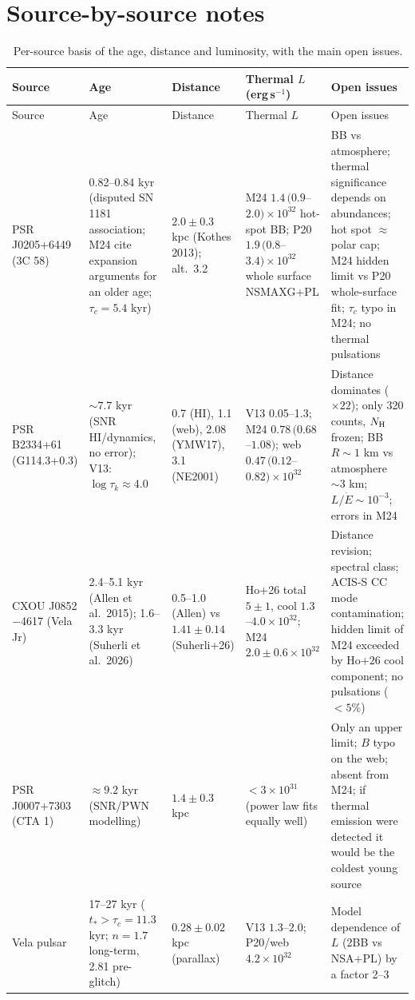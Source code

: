 \documentclass[11pt,a4paper]{article}
\begin{document}
\section{Source-by-source notes}
\begin{longtable}{P{2.3cm}P{2.9cm}P{2.9cm}P{3.0cm}P{3.2cm}}
\caption{Per-source basis of the age, distance and luminosity, with the main open issues.}\label{tab:sources}\\
\toprule
Source & Age & Distance & Thermal $L$ (erg\,s$^{-1}$) & Open issues \\
\midrule
\endfirsthead
\toprule Source & Age & Distance & Thermal $L$ & Open issues \\ \midrule
\endhead
PSR J0205+6449 (3C 58) & 0.82--0.84 kyr (disputed SN 1181 association; M24 cite expansion arguments for an older age; $\tau_c=5.4$ kyr) & $2.0\pm0.3$ kpc (Kothes 2013); alt.\ 3.2 & M24 $1.4\,(0.9$--$2.0)\times10^{32}$ hot-spot BB; P20 $1.9\,(0.8$--$3.4)\times10^{32}$ whole surface NSMAXG+PL & BB vs atmosphere; thermal significance depends on abundances; hot spot $\approx$ polar cap; M24 hidden limit vs P20 whole-surface fit; $\tau_c$ typo in M24; no thermal pulsations \\
PSR B2334+61 (G114.3+0.3) & $\sim7.7$ kyr (SNR HI/dynamics, no error); V13: $\log\tau_k\approx4.0$ & 0.7 (HI), 1.1 (web), 2.08 (YMW17), 3.1 (NE2001) & V13 0.05--1.3; M24 $0.78\,(0.68$--$1.08)$; web $0.47\,(0.12$--$0.82)\times10^{32}$ & Distance dominates ($\times22$); only 320 counts, $N_{\rm H}$ frozen; BB $R\sim1$ km vs atmosphere $\sim3$ km; $L/\dot E\sim10^{-3}$; errors in M24 \\
CXOU J0852$-$4617 (Vela Jr) & 2.4--5.1 kyr (Allen et al.\ 2015); 1.6--3.3 kyr (Suherli et al.\ 2026) & 0.5--1.0 (Allen) vs $1.41\pm0.14$ (Suherli+26) & Ho+26 total $5\pm1$, cool $1.3$--$4.0\times10^{32}$; M24 $2.0\pm0.6\times10^{32}$ & Distance revision; spectral class; ACIS-S CC mode contamination; hidden limit of M24 exceeded by Ho+26 cool component; no pulsations ($<5\%$) \\
PSR J0007+7303 (CTA 1) & $\approx9.2$ kyr (SNR/PWN modelling) & $1.4\pm0.3$ kpc & $<3\times10^{31}$ (power law fits equally well) & Only an upper limit; $B$ typo on the web; absent from M24; if thermal emission were detected it would be the coldest young source \\
Vela pulsar & 17--27 kyr ($t_*>\tau_c=11.3$ kyr; $n=1.7$ long-term, 2.81 pre-glitch) & $0.28\pm0.02$ kpc (parallax) & V13 $1.3$--$2.0$; P20/web $4.2\times10^{32}$ & Model dependence of $L$ (2BB vs NSA+PL) by a factor 2--3 \\

\end{longtable}
\end{document}
